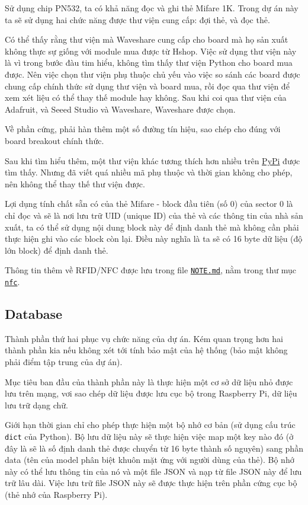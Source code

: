 Sử dụng chip PN532, ta có khả năng đọc và ghi thẻ Mifare 1K. Trong dự án
này ta sẽ sử dụng hai chức năng được thư viện cung cấp: đợi thẻ, và đọc
thẻ.

Có thể thấy rằng thư viện mà Waveshare cung cấp cho board mà họ sản xuất
không thực sự giống với module mua được từ Hshop. Việc sử dụng thư viện
này là vì trong bước đàu tim hiểu, không tìm thấy thư viện Python cho
board mua được. Nên việc chọn thư viện phụ thuộc chủ yếu vào việc so
sánh các board được chung cấp chính thức sử dụng thư viện và board mua,
rồi đọc qua thư viện để xem xét liệu có thể thay thế module hay không.
Sau khi coi qua thư viện của Adafruit, và Seeed Studio và Waveshare,
Waveshare được chọn.

Về phần cứng, phải hàn thêm một số đường tín hiệu, sao chép cho đúng với
board breakout chính thức.

Sau khi tìm hiểu thêm, một thư viện khác tương thích hơn nhiều trên
\href{https://pypi.org/project/pn532pi/}{PyPi} được tìm thấy. Nhưng đã
viết quá nhiều mã phụ thuộc và thời gian không cho phép, nên không thể
thay thế thư viện được.

Lợi dụng tính chất sẵn có của thẻ Mifare - block đầu tiên (số 0) của
sector 0 là chỉ đọc và sẽ là nơi lưu trữ UID (unique ID) của thẻ và các
thông tin của nhà sản xuất, ta có thể sử dụng nội dung block này để định
danh thẻ mà không cần phải thực hiện ghi vào các block còn lại. Điều này
nghĩa là ta sẽ có 16 byte dữ liệu (độ lớn block) để định danh thẻ.

Thông tin thêm về RFID/NFC được lưu trong file
\href{https://github.com/ntpt7921/RaspPi_AttendanceSystem/blob/main/nfc/NOTE.md}{\texttt{NOTE.md}},
nằm trong thư mục
\href{https://github.com/ntpt7921/RaspPi_AttendanceSystem/tree/main/nfc}{\texttt{nfc}}.

\hypertarget{Database}{%
\subsection{Database}\label{Database}}

Thành phần thứ hai phục vụ chức năng của dự án. Kém quan trọng hơn hai
thành phần kia nếu không xét tới tính bảo mật của hệ thống (bảo mật
không phải điểm tập trung của dự án).

Mục tiêu ban đầu của thành phần này là thực hiện một cơ sở dữ liệu nhỏ
được lưu trên mạng, vơi sao chép dữ liệu được lưu cục bộ trong Raspberry
Pi, dữ liệu lưu trữ dạng chữ.

Giới hạn thời gian chỉ cho phép thực hiện một bộ nhớ cơ bản (sử dụng cấu
trúc \texttt{dict} của Python). Bộ lưu dữ liệu này sẽ thực hiện việc map
một key nào đó (ở đây là sẽ là số định danh thẻ được chuyển từ 16 byte
thành số nguyên) sang phần data (tên của model phân biệt khuôn mặt ứng
với người dùng của thẻ). Bộ nhớ này có thể lưu thông tin của nó và một
file JSON và nạp từ file JSON này để lưu trữ lâu dài. Việc lưu trữ file
JSON này sẽ được thực hiện trên phần cứng cục bộ (thẻ nhớ của Raspberry
Pi).

